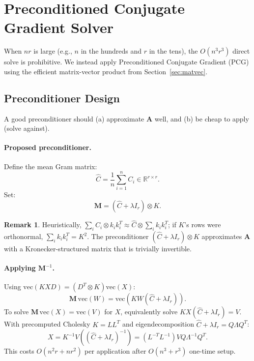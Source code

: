 \documentclass[12pt]{article}
\theoremstyle{definition}
\newtheorem{remark}{Remark}
\begin{document}
\section{Preconditioned Conjugate Gradient Solver}\label{sec:pcg}

When $nr$ is large (e.g., $n$ in the hundreds and $r$ in the tens), the $O(n^3r^3)$ direct solve is prohibitive. We instead apply Preconditioned Conjugate Gradient (PCG) using the efficient matrix-vector product from Section~\ref{sec:matvec}.

\subsection{Preconditioner Design}\label{sec:precond}

A good preconditioner should (a) approximate $\mathbf{A}$ well, and (b) be cheap to apply (solve against).

\paragraph{Proposed preconditioner.} Define the mean Gram matrix:
\[
\hat{C} = \frac{1}{n}\sum_{i=1}^n C_i \in \mathbb{R}^{r\times r}.
\]
Set:
\begin{equation}\label{eq:precond}
\mathbf{M} = (\hat{C} + \lambda I_r) \otimes K.
\end{equation}

\begin{remark}
Heuristically, $\sum_i C_i \otimes k_ik_i^T \approx \hat{C} \otimes \sum_i k_ik_i^T$; if $K$'s rows were orthonormal, $\sum_i k_ik_i^T = K^2$. The preconditioner $(\hat{C}+\lambda I_r)\otimes K$ approximates $\mathbf{A}$ with a Kronecker-structured matrix that is trivially invertible.
\end{remark}

\paragraph{Applying $\mathbf{M}^{-1}$.} Using $\mathrm{vec}(KXD) = (D^T\otimes K)\mathrm{vec}(X)$:
\[
\mathbf{M}\,\mathrm{vec}(W) = \mathrm{vec}(KW(\hat{C}+\lambda I_r)).
\]
To solve $\mathbf{M}\,\mathrm{vec}(X) = \mathrm{vec}(V)$ for $X$, equivalently solve $KX(\hat{C}+\lambda I_r) = V$. With precomputed Cholesky $K = LL^T$ and eigendecomposition $\hat{C}+\lambda I_r = Q\Lambda Q^T$:
\[
X = K^{-1} V ((\hat{C}+\lambda I_r)^{-1}) = (L^{-T}L^{-1}) V Q\Lambda^{-1}Q^T.
\]
This costs $O(n^2 r + nr^2)$ per application after $O(n^3 + r^3)$ one-time setup.
\end{document}
